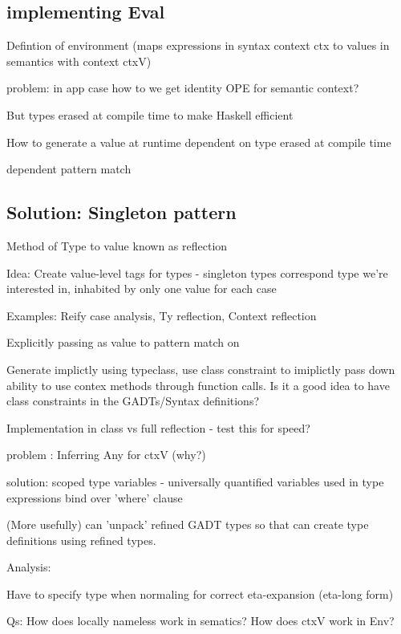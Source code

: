 \subsection{implementing Eval}

Defintion of environment (maps expressions in syntax context ctx to values in semantics with context ctxV)

problem: in app case how to we get identity OPE for semantic context?

But types erased at compile time to make Haskell efficient

How to generate a value at runtime dependent on type erased at compile time

dependent pattern match \cite{SingletonsGuide}

\subsection{Solution: Singleton pattern}

Method of Type to value known as reflection \cite{SingletonsGuide}

Idea: Create value-level tags for types - singleton types correspond type we're interested in, inhabited by only one value for each case

Examples: Reify case analysis, Ty reflection, Context reflection

Explicitly passing as value to pattern match on

Generate implictly using typeclass, use class constraint to imiplictly pass down ability to use contex methods through function calls.
Is it a good idea to have class constraints in the GADTs/Syntax definitions?

Implementation in class vs full reflection - test this for speed?

problem : Inferring Any for ctxV (why?)

solution: scoped type variables - universally quantified variables used in type expressions bind over 'where' clause

(More usefully) can 'unpack' refined GADT types so that can create type definitions using refined types.

Analysis:

Have to specify type when normaling for correct eta-expansion (eta-long form)

Qs:
How does locally nameless work in sematics?
How does ctxV work in Env?

